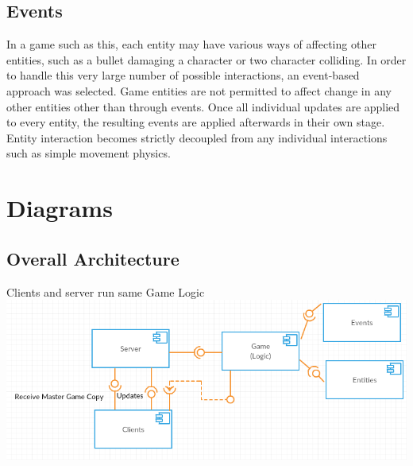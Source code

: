 \documentclass[12pt]{report}
\begin{document}
\subsection{Events}
In a game such as this, each entity may have various ways of affecting other
entities, such as a bullet damaging a character or two character colliding.  In
order to handle this very large number of possible interactions, an event-based
approach was selected.  Game entities are not permitted to affect change in any
other entities other than through events.  Once all individual updates are
applied to every entity, the resulting events are applied afterwards in their
own stage.  Entity interaction becomes strictly decoupled from any individual
interactions such as simple movement physics.

\section{Diagrams}
\subsection{Overall Architecture}
Clients and server run same Game Logic \\
\includegraphics[width=\linewidth]{images/overall_architecture.png}
\end{document}
